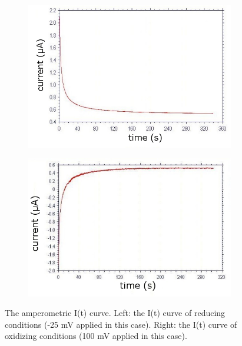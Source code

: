 \documentclass[twoside,single]{lion-msc}
\begin{document}
\begin{figure}[ht!]
\begin{subfigure}{.5\textwidth}
  \centering
  \includegraphics[width= \textwidth]{it25mV}

  \label{}
\end{subfigure}%
\begin{subfigure}{.5\textwidth}
  \centering
  \includegraphics[width= \linewidth]{it100mV}
  \label{}
\end{subfigure}
\caption{The amperometric I(t) curve.  Left: the I(t) curve of reducing conditions (-25 mV applied in this case). Right: the I(t) curve of oxidizing conditions (100 mV applied in this case).}
\label{it_curves}
\end{figure}
\end{document}

